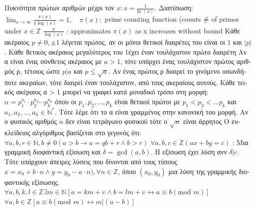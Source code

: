 \documentclass[12pt]{article}
\def\mod{\text{mod\ }} %
\def\ln{\text{ln\ }} %
\begin{document}
\begin{flushleft}
		\textgreek{Πυκνότητα πρώτων αριθμών μέχρι τον} $x: x = \frac{1}{\ln(x)}$. \textgreek{Διατύπωση:} $\lim_{x\to\infty} \frac{\pi(x)}{x\log (x)} = 1 , \quad \pi(x): $ prime counting function (counts \# of primes under $ x \in \mathbb{Z}$ \linebreak 
		\textbullet $\frac{x}{\log (x)} $  :  approximates $\pi(x)$ as x increases without bound \linebreak 
	\textbullet \quad \textgreek{Κάθε ακέραιος} $p \neq 0, \pm 1$ \textgreek{λέγεται πρώτος, αν οι μόνοι θετικοί διαιρέτες του είναι οι} $1$ \textgreek{και} $|p|$. \linebreak 
	\textbullet \quad \textgreek{Κάθε θετικός ακέραιος μεγαλύτερος του 1έχει έναν τουλάχιστον πρώτο διαιρέτη} \linebreak 
	\textbullet \quad \textgreek{Αν α είναι ένας σύνθετος ακέραιος με} $a>1$, \textgreek{τότε υπάρχει ένας τουλάχιστον πρώτος αριθμός ρ, τέτοιος ώστε} $p|a$ \textgreek{και} $p \leq \sqrt{a}$.\linebreak 
	\textbullet \quad \textgreek{Αν ένας πρώτος ρ διαιρεί το γινόμενο οσωνδήποτε ακεραίων, τότε διαιρεί έναν τουλάχιστον, από τους ακεραίους αυτούς}. \linebreak 
	\textbullet \quad \textgreek{Κάθε τεικός ακέραιος α > 1 μπορεί να γραφεί κατά μοναδικό τρόπο στη μορφή: } $\alpha = p_1^{a_1} \cdot p_2^{a_2} \cdots p_k^{a_k} $ \textgreek{όπου οι} $p_1, p_2, \ldots, p_k$ \textgreek{είναι θετικοί πρώτοι με} $p_1 < p_2 < \ldots p_k$ \textgreek{και} $a_1, a_2, \ldots, a_k \in \mathbb{N}^*$. \textgreek{Τότε λέμε ότι το α είναι γραμμένος στην κανονική του μορφή}. \linebreak 
	\textbullet \quad \textgreek{Αν ο φυσικός αριθμός} $n$ \textgreek{δεν είναι τετράγωνο φυσικού τότε ο} $\sqrt{n}$ \textgreek{είναι άρρητος} \linebreak 
	\textbullet \quad \textgreek{Ο ευκλείδειος αλγόριθμος βασίζεται στο γεγονός ότι}: $\forall a, b, r \in \mathbb{N}, b\neq 0 (a>b \rightarrow a = qb + r \land b>r) $ \linebreak 
	\textbullet \quad $\forall a,b,c \in \mathbb{Z} (ax + by = c) $  :  \textgreek{Μια γραμμική διοφαντική εξίσωση και} $\delta = \gcd(a,b)$. \textgreek{Η εξίσωση έχει λύση ανν} $\delta | c$. \textgreek{Τότε υπάρχουν άπειρες λύσεις που δίνονται από τους τύπους} $x= x_0 +b\cdot n \land y =y_0 -a\cdot n), \forall n \in \mathbb{Z} $, \textgreek{όπου} $(x_0,y_0)$ \textgreek{μια λύση της γραμμικής διοφαντικής εξίσωσης}. \linebreak 
	\textbullet \quad $\forall a, b, k, l \in \mathbb{Z} \exists m \in \mathbb{N} \left[a = km + \upsilon \land b = lm + \upsilon \leftrightarrow a \equiv b (\mod m) \right]$ \linebreak 
	\textbullet \quad $ \forall a, b \in \mathbb{Z} \left[a\equiv b(\mod m) \leftrightarrow m|(a-b) \right] $ \linebreak 
	

\end{flushleft}
\end{document}

